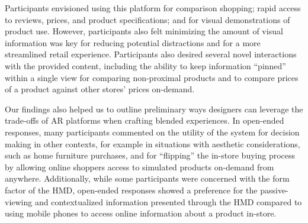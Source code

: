 Participants envisioned using this platform for comparison shopping; rapid access to reviews, prices, and product specifications; and for visual demonstrations of product use. However, participants also felt minimizing the amount of visual information was key for reducing potential distractions and for a more streamlined retail experience. 
Participants also desired several novel interactions with the provided content, including the ability to keep information ``pinned'' within a single view for comparing non-proximal products and to compare prices of a product against other stores' prices on-demand. 

Our findings also helped us to outline preliminary ways designers can leverage the trade-offs of AR platforms when crafting blended experiences. In open-ended responses, many participants commented on the utility of the system for decision making in other contexts, for example in situations with aesthetic considerations, such as home furniture purchases, and for ``flipping'' the in-store buying process by allowing online shoppers access to simulated products on-demand from anywhere. Additionally, while some participants were concerned with the form factor of the HMD, open-ended responses showed a preference for the passive-viewing and contextualized information presented through the HMD compared to using mobile phones to access online information about a product in-store. 


